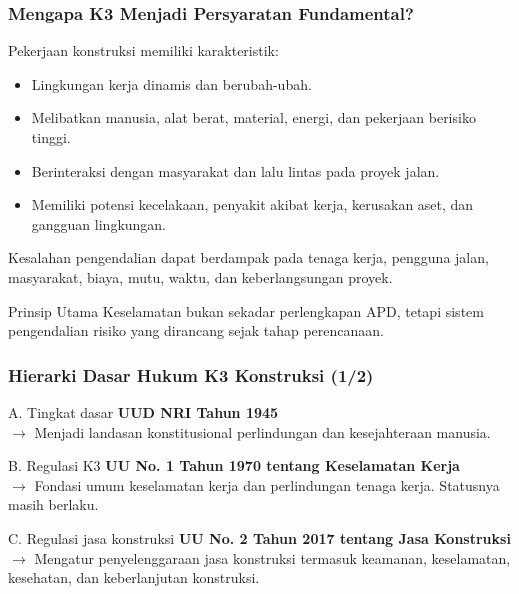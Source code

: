 \documentclass[../main.tex]{subfiles}
\begin{document}
\begin{frame}[mytitle=standard,c,mycolor=white]
	\frametitle{Mengapa K3 Menjadi Persyaratan Fundamental?}

	\begin{block}{Pekerjaan konstruksi memiliki karakteristik:}
		\begin{itemize}
			\item Lingkungan kerja dinamis dan berubah-ubah.
			\item Melibatkan manusia, alat berat, material, energi, dan pekerjaan berisiko tinggi.
			\item Berinteraksi dengan masyarakat dan lalu lintas pada proyek jalan.
			\item Memiliki potensi kecelakaan, penyakit akibat kerja, kerusakan aset, dan gangguan lingkungan.
		\end{itemize}
	\end{block}

	Kesalahan pengendalian dapat berdampak pada tenaga kerja, pengguna jalan, masyarakat, biaya, mutu, waktu, dan keberlangsungan proyek.

	\begin{alertblock}{Prinsip Utama}
		Keselamatan bukan sekadar perlengkapan APD, tetapi sistem pengendalian risiko yang dirancang sejak tahap perencanaan.
	\end{alertblock}
\end{frame}

\begin{frame}[mytitle=center,t,mycolor=digiPH_gray!30]
	\frametitle{Hierarki Dasar Hukum K3 Konstruksi (1/2)}

	\begin{block}{A. Tingkat dasar}
		\textbf{UUD NRI Tahun 1945}\\
		$\rightarrow$ Menjadi landasan konstitusional perlindungan dan kesejahteraan manusia.
	\end{block}

	\begin{block}{B. Regulasi K3}
		\textbf{UU No. 1 Tahun 1970 tentang Keselamatan Kerja}\\
		$\rightarrow$ Fondasi umum keselamatan kerja dan perlindungan tenaga kerja. Statusnya masih berlaku.
	\end{block}

	\begin{block}{C. Regulasi jasa konstruksi}
		\textbf{UU No. 2 Tahun 2017 tentang Jasa Konstruksi}\\
		$\rightarrow$ Mengatur penyelenggaraan jasa konstruksi termasuk keamanan, keselamatan, kesehatan, dan keberlanjutan konstruksi.
	\end{block}
\end{frame}
\end{document}
